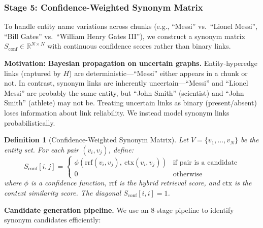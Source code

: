 \documentclass[11pt,a4paper]{article}
\newtheorem{definition}{Definition}
\begin{document}
\subsubsection{Stage 5: Confidence-Weighted Synonym Matrix}
\label{sec:synonym}

To handle entity name variations across chunks (e.g., ``Messi'' vs.\ ``Lionel Messi'', ``Bill Gates'' vs.\ ``William Henry Gates III''), we construct a synonym matrix $S_{\text{conf}} \in \mathbb{R}^{N \times N}$ with continuous confidence scores rather than binary links.

\textbf{Motivation: Bayesian propagation on uncertain graphs.} Entity-hyperedge links (captured by $H$) are deterministic---``Messi'' either appears in a chunk or not. In contrast, synonym links are inherently uncertain---``Messi'' and ``Lionel Messi'' are probably the same entity, but ``John Smith'' (scientist) and ``John Smith'' (athlete) may not be. Treating uncertain links as binary (present/absent) loses information about link reliability. We instead model synonym links probabilistically.

\begin{definition}[Confidence-Weighted Synonym Matrix]
Let $V = \{v_1, \ldots, v_N\}$ be the entity set. For each pair $(v_i, v_j)$, define:
\begin{equation}
    S_{\text{conf}}[i,j] = \begin{cases}
        \phi(\text{rrf}(v_i, v_j),\ \text{ctx}(v_i, v_j)) & \text{if pair is a candidate} \\
        0 & \text{otherwise}
    \end{cases}
\end{equation}
where $\phi$ is a confidence function, $\text{rrf}$ is the hybrid retrieval score, and $\text{ctx}$ is the context similarity score. The diagonal $S_{\text{conf}}[i,i] = 1$.
\end{definition}

\textbf{Candidate generation pipeline.} We use an 8-stage pipeline to identify synonym candidates efficiently:
\end{document}
